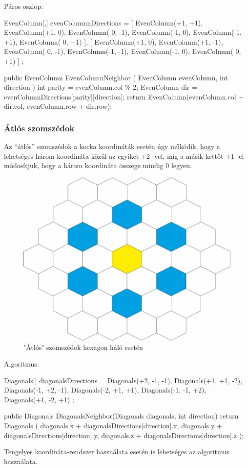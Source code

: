 Páros oszlop: 
\begin{cpp}
EvenColumn[,] evenColumnnDirections = 
{ 
   [ 
      EvenColumn(+1, +1), EvenColumn(+1,  0), EvenColumn( 0, -1),
      EvenColumn(-1,  0), EvenColumn(-1, +1), EvenColumn( 0, +1) 
   ],
   [  
      EvenColumn(+1,  0), EvenColumn(+1, -1), EvenColumn( 0, -1),
      EvenColumn(-1, -1), EvenColumn(-1,  0), EvenColumn( 0, +1) 
   ]
};

public EvenColumn EvenColumnNeighbor
(
   EvenColumn evenColumn, 
   int direction
)
{
   int parity = evenColumn.col \% 2;
   EvenColumn dir = evenColumnDirections[parity][direction];
   return EvenColumn(evenColumn.col + dir.col, evenColumn.row + dir.row);
}   
\end{cpp}

\subsubsection{Átlós szomszédok}

\noindent Az “átlós” szomszédok a kocka koordináták esetén úgy működik, hogy a lehetséges három koordináta közül az egyiket $ \pm 2$ -vel, míg a másik kettőt $\mp 1$ -el módosítjuk, hogy a három koordináta összege mindig $0$ legyen.

\begin{figure}[h!]
\centering
\includegraphics[scale=0.3]{kepek/Diagonals.jpg}
\caption{"Átlós" szomszédok hexagon háló esetén}
\label{fig:Diagonals}
\end{figure}

\noindent Algoritmus:
\begin{cpp}  
Diagonals[] diagonalsDirections = 
{ 
   Diagonals(+2, -1, -1), Diagonals(+1, +1, -2), Diagonals(-1, +2, -1), 
   Diagonals(-2, +1, +1), Diagonals(-1, -1, +2), Diagonals(+1, -2, +1)
};

public Diagonals DiagonalsNeighbor(Diagonals diagonals, int direction)
{
   return Diagonals
   (
      diagonals.x + diagonalsDirections[direction].x, 
      diagonals.y + diagonalsDirections[direction].y, 
      diagonals.z + diagonalsDirections[direction].z
   );
}         
\end{cpp}

\noindent Tengelyes koordináta-rendszer használata esetén is lehetséges az algoritmus használata.